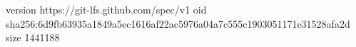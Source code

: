 version https://git-lfs.github.com/spec/v1
oid sha256:6d9fb63935a1849a5ec1616af22ac5976a04a7c555c1903051171e31528afa2d
size 1441188
